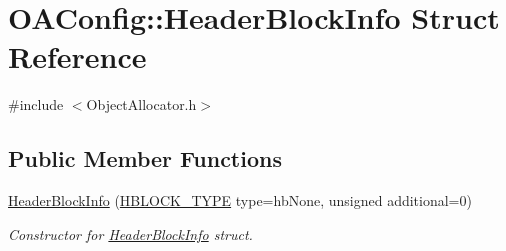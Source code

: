 \hypertarget{structOAConfig_1_1HeaderBlockInfo}{\section{O\-A\-Config\-:\-:Header\-Block\-Info Struct Reference}
\label{structOAConfig_1_1HeaderBlockInfo}
}


{\ttfamily \#include $<$Object\-Allocator.\-h$>$}

\subsection*{Public Member Functions}
\begin{DoxyCompactItemize}
\item 
\hyperlink{structOAConfig_1_1HeaderBlockInfo_a4cf2cea9fdd52fec942d0746f094e5f8}{Header\-Block\-Info} (\hyperlink{structOAConfig_a741c6dd161c0174180cc17f9a697b123}{H\-B\-L\-O\-C\-K\-\_\-\-T\-Y\-P\-E} type=hb\-None, unsigned additional=0)
\begin{DoxyCompactList}\small\item\em Constructor for \hyperlink{structOAConfig_1_1HeaderBlockInfo}{Header\-Block\-Info} struct. \end{DoxyCompactList}\end{DoxyCompactItemize}
